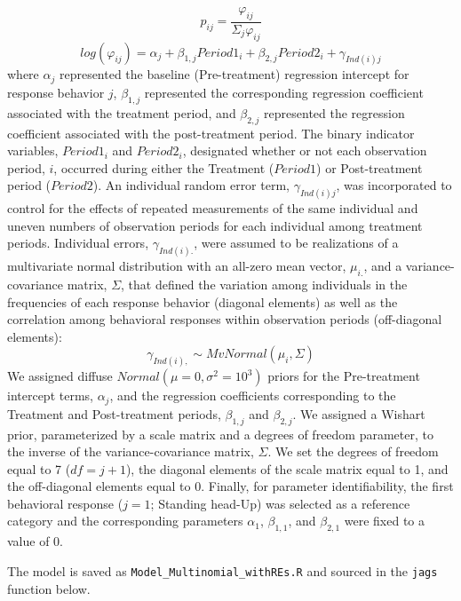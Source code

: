 \documentclass[]{article}
\begin{document}
\[p_{ij} = \frac{\varphi_{ij}}{\Sigma_j\varphi_{ij}} \]
\[log(\varphi_{ij}) = \alpha_j + \beta_{1,j}Period1_i+\beta_{2,j}Period2_i+\gamma_{Ind(i)j} \]
where \(\alpha_j\) represented the baseline (Pre-treatment) regression
intercept for response behavior \(j\), \(\beta_{1,j}\) represented the
corresponding regression coefficient associated with the treatment
period, and \(\beta_{2,j}\) represented the regression coefficient
associated with the post-treatment period. The binary indicator
variables, \(Period1_i\) and \(Period2_i\), designated whether or not
each observation period, \(i\), occurred during either the Treatment
(\(Period1\)) or Post-treatment period (\(Period2\)). An individual
random error term, \(\gamma_{Ind(i)j}\), was incorporated to control for
the effects of repeated measurements of the same individual and uneven
numbers of observation periods for each individual among treatment
periods. Individual errors, \(\gamma_{Ind(i).}\), were assumed to be
realizations of a multivariate normal distribution with an all-zero mean
vector, \(\mu_{i.}\), and a variance-covariance matrix, \(\Sigma\), that
defined the variation among individuals in the frequencies of each
response behavior (diagonal elements) as well as the correlation among
behavioral responses within observation periods (off-diagonal elements):
\[\gamma_{Ind(i),}\sim MvNormal(\mu_i,\Sigma)\] We assigned diffuse
\(Normal(\mu = 0, \sigma^2 = 10^3)\) priors for the Pre-treatment
intercept terms, \(\alpha_j\), and the regression coefficients
corresponding to the Treatment and Post-treatment periods,
\(\beta_{1,j}\) and \(\beta_{2,j}\). We assigned a Wishart prior,
parameterized by a scale matrix and a degrees of freedom parameter, to
the inverse of the variance-covariance matrix, \(\Sigma\). We set the
degrees of freedom equal to 7 (\(df = j + 1\)), the diagonal elements of
the scale matrix equal to 1, and the off-diagonal elements equal to 0.
Finally, for parameter identifiability, the first behavioral response
(\(j = 1\); Standing head-Up) was selected as a reference category and
the corresponding parameters \(\alpha_1\), \(\beta_{1,1}\), and
\(\beta_{2,1}\) were fixed to a value of 0.

The model is saved as \texttt{Model\_Multinomial\_withREs.R} and sourced
in the \texttt{jags} function below.
\end{document}
